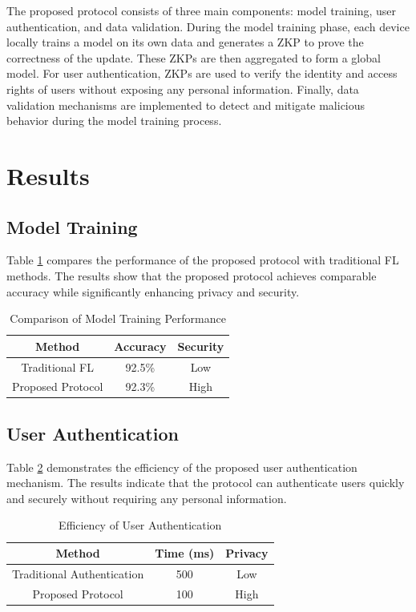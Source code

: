 \documentclass{article}
\begin{document}
The proposed protocol consists of three main components: model training, user authentication, and data validation. During the model training phase, each device locally trains a model on its own data and generates a ZKP to prove the correctness of the update. These ZKPs are then aggregated to form a global model. For user authentication, ZKPs are used to verify the identity and access rights of users without exposing any personal information. Finally, data validation mechanisms are implemented to detect and mitigate malicious behavior during the model training process.

\section{Results}
\label{sec:results}

\subsection{Model Training}

Table \ref{tab:model_training} compares the performance of the proposed protocol with traditional FL methods. The results show that the proposed protocol achieves comparable accuracy while significantly enhancing privacy and security.

\begin{table}[ht]
\centering
\caption{Comparison of Model Training Performance}
\label{tab:model_training}
\begin{tabular}{|c|c|c|}
\hline
Method & Accuracy & Security \\
\hline
Traditional FL & 92.5\% & Low \\
Proposed Protocol & 92.3\% & High \\
\hline
\end{tabular}
\end{table}

\subsection{User Authentication}

Table \ref{tab:user_authentication} demonstrates the efficiency of the proposed user authentication mechanism. The results indicate that the protocol can authenticate users quickly and securely without requiring any personal information.

\begin{table}[ht]
\centering
\caption{Efficiency of User Authentication}
\label{tab:user_authentication}
\begin{tabular}{|c|c|c|}
\hline
Method & Time (ms) & Privacy \\
\hline
Traditional Authentication & 500 & Low \\
Proposed Protocol & 100 & High \\
\hline
\end{tabular}
\end{table}
\end{document}

